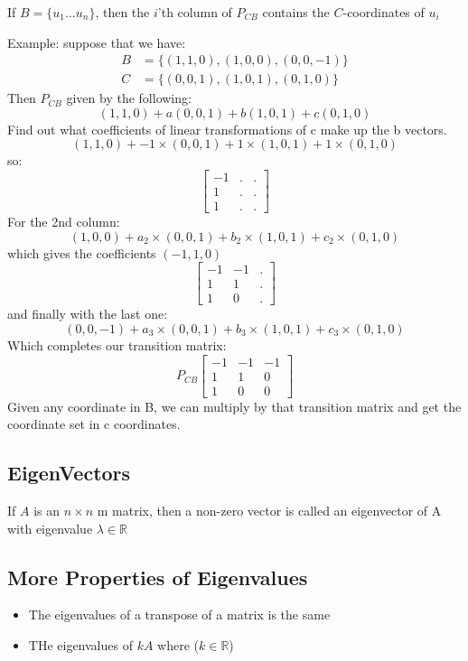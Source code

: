 \documentclass[11pt]{book}
\begin{document}
{{{	If $B=\lbrace u_{1}...u_{n}\rbrace$, then the $i$'th column of  $P_{CB}$ contains the $C$-coordinates of  $u_{i}$
}
\par{
Example: suppose that we have:
}
\begin{align}
	B&=\lbrace\left(1,1,0\right), \left(1,0,0\right), \left(0,0,-1\right)\rbrace \\
	C&=\lbrace\left(0,0,1\right), \left(1,0,1\right), \left(0,1,0\right)\rbrace
\end{align}
Then $P_{CB}$ given by the following: \[
\left(1,1,0\right)+a\left(0,0,1\right)+b\left(1,0,1\right)+c\left(0,1,0\right)
\] Find out what coefficients of linear transformations of c make up the b vectors. \[
\left(1,1,0\right)+-1\times\left(0,0,1\right)+1\times\left(1,0,1\right)+1\times\left(0,1,0\right)
\] so: \[
\left[
\begin{matrix}
	-1 & .&.  \\
	1 & .&. \\
	1 & .&.
\end{matrix}
\right]
\] For the 2nd column: \[
\left(1,0,0\right)+a_{2}\times\left(0,0,1\right)+b_{2}\times\left(1,0,1\right)+c_{2}\times\left(0,1,0\right)
\] which gives the coefficients $\left(-1,1,0\right)$ \[
\left[
\begin{matrix}
	-1 & -1&.  \\
	1 & 1&. \\
	1 & 0&.
\end{matrix}
\right]
\] and finally with the last one: \[
\left(0,0,-1\right)+a_{3}\times\left(0,0,1\right)+b_{3}\times\left(1,0,1\right)+c_{3}\times\left(0,1,0\right)
\] Which completes our transition matrix: \[
P_{CB}\left[
\begin{matrix}
	-1 & -1&-1  \\
	1 & 1&0 \\
	1 & 0&0
\end{matrix}
\right]
\] Given any coordinate in B, we can multiply by that transition matrix and get the coordinate set in c coordinates.
\subsection{EigenVectors}
\par{If $A $ is an $n\times n$ m matrix, then a non-zero vector is called an eigenvector of A with eigenvalue $\lambda\in\mathbb{R}$}

\subsection{More Properties of Eigenvalues}
\begin{itemize}
	\item{The eigenvalues of a transpose of a matrix is the same}
	\item{THe eigenvalues of $kA$ where  ($k\in \mathbb{R}$)}
\end{itemize}

}}
\end{document}
